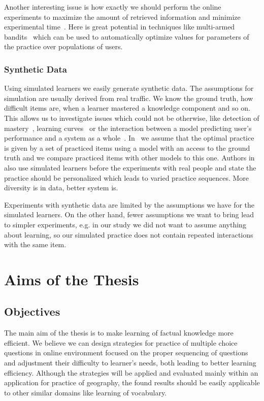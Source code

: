 \documentclass[table,color,cover,twoside,nolot,nolof]{fithesis3/fithesis3}
\begin{document}
Another interesting issue is how exactly we should perform the online
experiments to maximize the amount of retrieved information and minimize
experimental time~\cite{liu2014towards}. Here is great potential in techniques
like multi-armed bandits~\cite{liu2014trading} which can be used to
automatically optimize values for parameters of the practice over populations
of users.

\subsection{Synthetic Data}

Using simulated learners we easily generate synthetic data. The assumptions for
simulation are usually derived from real traffic. We know the ground truth, how
difficult items are, when a learner mastered a knowledge component and so on.
This allows us to investigate issues which could not be otherwise, like
detection of mastery~\cite{fancsali2013optimal}, learning
curves~\cite{fancsali2013simulated} or the interaction between a model
predicting user's performance and a system as a
whole~\cite{niznan2015exploring}. In~\cite{niznan2015exploring} we assume that
the optimal practice is given by a set of practiced items using a model with an
access to the ground truth and we compare practiced items with other models to
this one. Authors in~\cite{lopes2015multi} also use simulated learners before
the experiments with real people and state the practice should be personalized
which leads to varied practice sequences. More diversity is in data, better
system is.

Experiments with synthetic data are limited by the assumptions we have for the
simulated learners. On the other hand, fewer assumptions we want to bring lead
to simpler experiments, e.g. in our study we did not want to assume anything
about learning, so our simulated practice does not contain repeated
interactions with the same item.

\chapter{Aims of the Thesis}
\label{chapter:aims_of_the_thesis}

\section{Objectives}

The main aim of the thesis is to make learning of factual knowledge more
efficient. We believe we can design strategies for practice of
multiple choice questions in online environment focused on the proper
sequencing of questions and adjustment their difficulty to learner's needs,
both leading to better learning efficiency. Although the strategies will be
applied and evaluated mainly within an application for practice of geography,
the found results should be easily applicable to other similar domains like
learning of vocabulary.
\end{document}
